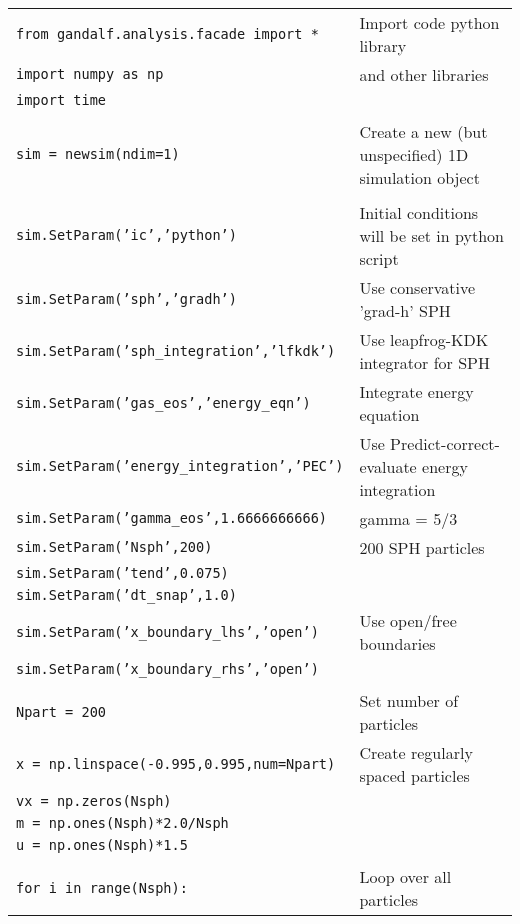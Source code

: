\documentclass[a4paper]{article}
\newcommand{\var}[1]{\texttt{#1}}
\begin{document}
\newpage

 \\
\begin{tabular}{p{8.0cm}p{7.0cm}}
\var{from gandalf.analysis.facade import *}& Import code python library \\
\var{import numpy as np}                   & and other libraries \\
\var{import time}                          & \\
& \\
\var{sim = newsim(ndim=1)}                 & Create a new (but unspecified) 1D simulation object \\
& \\                                       
\var{sim.SetParam('ic','python')}          & Initial conditions will be set in python script  \\
\var{sim.SetParam('sph','gradh')}          & Use conservative 'grad-h' SPH \\
\var{sim.SetParam('sph\_integration','lfkdk')} & Use leapfrog-KDK integrator for SPH \\
\var{sim.SetParam('gas\_eos','energy\_eqn')} & Integrate energy equation \\
\var{sim.SetParam('energy\_integration','PEC')} & Use Predict-correct-evaluate energy integration \\
\var{sim.SetParam('gamma\_eos',1.6666666666)} & gamma = 5/3\\
\var{sim.SetParam('Nsph',200)} & 200 SPH particles \\
\var{sim.SetParam('tend',0.075)} & \\
\var{sim.SetParam('dt\_snap',1.0)} & \\
\var{sim.SetParam('x\_boundary\_lhs','open')} & Use open/free boundaries\\
\var{sim.SetParam('x\_boundary\_rhs','open')} & \\
& \\                      
\var{Npart = 200} &  Set number of particles \\
\var{x = np.linspace(-0.995,0.995,num=Npart)} & Create regularly spaced particles \\
\var{vx = np.zeros(Nsph)}  & \\
\var{m = np.ones(Nsph)*2.0/Nsph} & \\
\var{u = np.ones(Nsph)*1.5} & \\
& \\          
\var{for i in range(Nsph):}   & Loop over all particles \\

\end{tabular}
\end{document}
